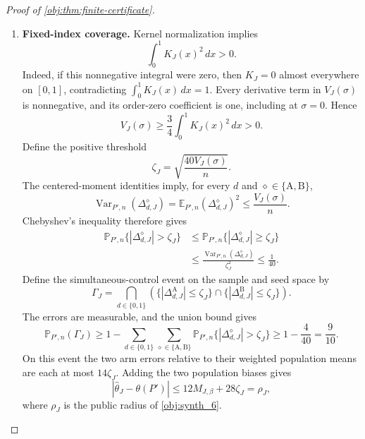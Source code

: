 \documentclass[11pt]{article}
\begin{document}
\begin{proof}[Proof of \cref{obj:thm:finite-certificate}]
\begin{enumerate}
The triangle inequality for the two arm estimates and their population biases now gives
\[
\begin{aligned}
|\widehat\theta_J-\theta(P')|
\le{}&12M_{J,\beta}\\
&+8\bigl(|\Delta^{\mathrm A}_{1,J}|
+|\Delta^{\mathrm A}_{0,J}|\bigr)
+6\bigl(|\Delta^{\mathrm B}_{1,J}|
+|\Delta^{\mathrm B}_{0,J}|\bigr).
\end{aligned}
\]
For each of the four errors, Cauchy--Schwarz on the probability experiment gives
\[
\mathbb E_{P',n}|\Delta^\diamond_{d,J}|
\le\sqrt{\mathbb E_{P',n}(\Delta^\diamond_{d,J})^2}
\le\sqrt{\frac{V_J(\sigma)}n}.
\]
The displayed upper bound on the effect error is integrable, so integration yields
\[
\mathbb E_{P',n}|\widehat\theta_J-\theta(P')|
\le12M_{J,\beta}
+28\sqrt{\frac{V_J(\sigma)}n}.
\]

\item \textbf{Fixed-index coverage.}
Kernel normalization implies
\[
\int_0^1K_J(x)^2\,dx>0.
\]
Indeed, if this nonnegative integral were zero, then \(K_J=0\) almost everywhere on \([0,1]\), contradicting
\(\int_0^1K_J(x)\,dx=1\). Every derivative term in \(V_J(\sigma)\) is nonnegative, and its order-zero coefficient is one, including at \(\sigma=0\). Hence
\[
V_J(\sigma)\ge\frac34\int_0^1K_J(x)^2\,dx>0.
\]
Define the positive threshold
\[
\zeta_J=\sqrt{\frac{40V_J(\sigma)}n}.
\]
The centered-moment identities imply, for every \(d\) and
\(\diamond\in\{\mathrm A,\mathrm B\}\),
\[
\operatorname{Var}_{P',n}(\Delta^\diamond_{d,J})
=\mathbb E_{P',n}(\Delta^\diamond_{d,J})^2
\le\frac{V_J(\sigma)}n.
\]
Chebyshev's inequality therefore gives
\[
\begin{aligned}
\mathbb P_{P',n}\{|\Delta^\diamond_{d,J}|>\zeta_J\}
&\le\mathbb P_{P',n}\{|\Delta^\diamond_{d,J}|\ge\zeta_J\}\\
&\le\frac{\operatorname{Var}_{P',n}(\Delta^\diamond_{d,J})}
{\zeta_J^2}
\le\frac1{40}.
\end{aligned}
\]
Define the simultaneous-control event on the sample and seed space by
\[
\Gamma_J
=\bigcap_{d\in\{0,1\}}
\left(
\{|\Delta^{\mathrm A}_{d,J}|\le\zeta_J\}
\cap
\{|\Delta^{\mathrm B}_{d,J}|\le\zeta_J\}
\right).
\]
The errors are measurable, and the union bound gives
\[
\mathbb P_{P',n}(\Gamma_J)
\ge1-\sum_{d\in\{0,1\}}
\sum_{\diamond\in\{\mathrm A,\mathrm B\}}
\mathbb P_{P',n}\{|\Delta^\diamond_{d,J}|>\zeta_J\}
\ge1-\frac4{40}=\frac9{10}.
\]
On this event the two arm errors relative to their weighted population means are each at most \(14\zeta_J\). Adding the two population biases gives
\[
|\widehat\theta_J-\theta(P')|
\le12M_{J,\beta}+28\zeta_J
=\rho_J,
\]
where \(\rho_J\) is the public radius of \cref{obj:synth_6}.


\end{enumerate}
\end{proof}
\end{document}
